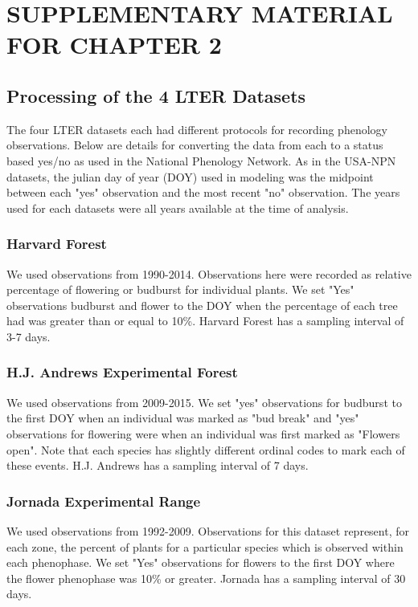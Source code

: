 \chapter{SUPPLEMENTARY MATERIAL FOR CHAPTER 2}

\section{Processing of the 4 LTER Datasets}\label{appendix-a}

The four LTER datasets each had different protocols for recording phenology observations. Below are details for converting the data from each to a status based yes/no as used in the National Phenology Network. As in the USA-NPN datasets, the julian day of year (DOY) used in modeling was the midpoint between each "yes" observation and the most recent "no" observation. The years used for each datasets were all years available at the time of analysis. 

\subsection{Harvard Forest}
We used observations from 1990-2014. Observations here were recorded as relative percentage of flowering or budburst for individual plants. We set "Yes" observations budburst and flower to the DOY when the percentage of each tree had was greater than or equal to 10\%. Harvard Forest has a sampling interval of 3-7 days.

\subsection{H.J. Andrews Experimental Forest}
We used observations from 2009-2015. We set "yes" observations for budburst to the first DOY when an individual was marked as "bud break" and "yes" observations for flowering were when an individual was first marked as "Flowers open". Note that each species has slightly different ordinal codes to mark each of these events. H.J. Andrews has a sampling interval of 7 days.  

\subsection{Jornada Experimental Range}
We used observations from 1992-2009. Observations for this dataset represent, for each zone, the percent of plants for a particular species which is observed within each phenophase. We set "Yes" observations for flowers to the first DOY where the flower phenophase was 10\% or greater. Jornada has a sampling interval of 30 days. 

